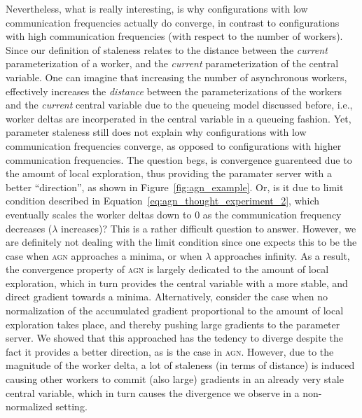 Nevertheless, what is really interesting, is why configurations with low communication frequencies actually do converge, in contrast to configurations with high communication frequencies (with respect to the number of workers). Since our definition of staleness relates to the distance between the \emph{current} parameterization of a worker, and the \emph{current} parameterization of the central variable. One can imagine that increasing the number of asynchronous workers, effectively increases the \emph{distance} between the parameterizations of the workers and the \emph{current} central variable due to the queueing model discussed before, i.e., worker deltas are incorperated in the central variable in a queueing fashion. Yet, parameter staleness still does not explain why configurations with low communication frequencies converge, as opposed to configurations with higher communication frequencies. The question begs, is convergence guarenteed due to the amount of local exploration, thus providing the paramater server with a better ``direction'', as shown in Figure~\ref{fig:agn_example}. Or, is it due to limit condition described in Equation~\ref{eq:agn_thought_experiment_2}, which eventually scales the worker deltas down to 0 as the communication frequency decreases ($\lambda$ increases)? This is a rather difficult question to answer. However, we are definitely not dealing with the limit condition since one expects this to be the case when \textsc{agn} approaches a minima, or when $\lambda$ approaches infinity. As a result, the convergence property of \textsc{agn} is largely dedicated to the amount of local exploration, which in turn provides the central variable with a more stable, and direct gradient towards a minima. Alternatively, consider the case when no normalization of the accumulated gradient proportional to the amount of local exploration takes place, and thereby pushing large gradients to the parameter server. We showed that this approached has the tedency to diverge despite the fact it provides a better direction, as is the case in \textsc{agn}. However, due to the magnitude of the worker delta, a lot of staleness (in terms of distance) is induced causing other workers to commit (also large) gradients in an already very stale central variable, which in turn causes the divergence we observe in a non-normalized setting.\\

